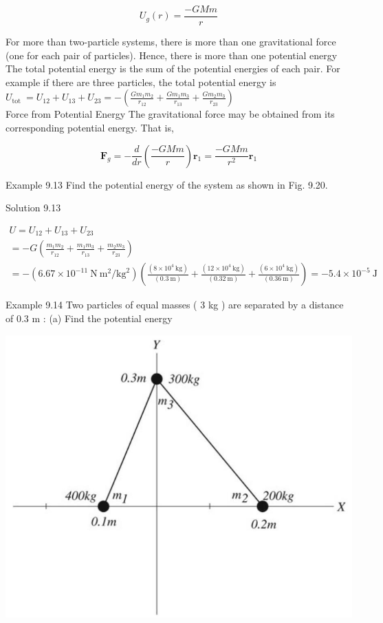 \documentclass[10pt]{article}
\begin{document}
$$
U_{g}(r)=\frac{-G M m}{r}
$$

For more than two-particle systems, there is more than one gravitational force (one for each pair of particles). Hence, there is more than one potential energy The total potential energy is the sum of the potential energies of each pair. For example if there are three particles, the total potential energy is\\
$U_{\text {tot }}=U_{12}+U_{13}+U_{23}=-\left(\frac{G m_{1} m_{2}}{r_{12}}+\frac{G m_{1} m_{3}}{r_{13}}+\frac{G m_{2} m_{3}}{r_{23}}\right)$\\
Force from Potential Energy The gravitational force may be obtained from its corresponding potential energy. That is,

$$
\mathbf{F}_{g}=-\frac{d}{d r}\left(\frac{-G M m}{r}\right) \mathbf{r}_{1}=\frac{-G M m}{r^{2}} \mathbf{r}_{1}
$$

Example 9.13 Find the potential energy of the system as shown in Fig. 9.20.

Solution 9.13

$$
\begin{gathered}
U=U_{12}+U_{13}+U_{23} \\
=-G\left(\frac{m_{1} m_{2}}{r_{12}}+\frac{m_{1} m_{3}}{r_{13}}+\frac{m_{2} m_{3}}{r_{23}}\right) \\
=-\left(6.67 \times 10^{-11} \mathrm{~N} \mathrm{~m}^{2} / \mathrm{kg}^{2}\right)\left(\frac{\left(8 \times 10^{4} \mathrm{~kg}\right)}{(0.3 \mathrm{~m})}+\frac{\left(12 \times 10^{4} \mathrm{~kg}\right)}{(0.32 \mathrm{~m})}+\frac{\left(6 \times 10^{4} \mathrm{~kg}\right)}{(0.36 \mathrm{~m})}\right)=-5.4 \times 10^{-5} \mathrm{~J}
\end{gathered}
$$

Example 9.14 Two particles of equal masses ( 3 kg ) are separated by a distance of 0.3 m : (a) Find the potential energy

\begin{center}
\includegraphics[max width=\textwidth]{2024_09_13_db1f357d2aad0a03eb2eg-155}
\end{center}
\end{document}
